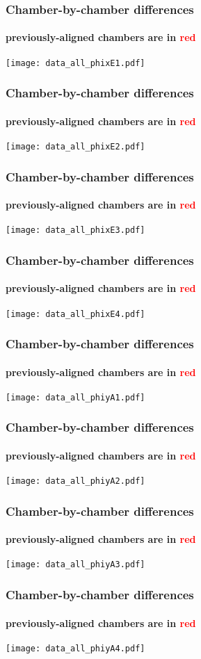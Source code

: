 \documentclass[compress]{beamer}
\begin{document}
\begin{frame}
\frametitle{Chamber-by-chamber differences}
\framesubtitle{previously-aligned chambers are in \textcolor{red}{red}}
\texttt{[image: data\_all\_phixE1.pdf]}
\end{frame}

\begin{frame}
\frametitle{Chamber-by-chamber differences}
\framesubtitle{previously-aligned chambers are in \textcolor{red}{red}}
\texttt{[image: data\_all\_phixE2.pdf]}
\end{frame}

\begin{frame}
\frametitle{Chamber-by-chamber differences}
\framesubtitle{previously-aligned chambers are in \textcolor{red}{red}}
\texttt{[image: data\_all\_phixE3.pdf]}
\end{frame}

\begin{frame}
\frametitle{Chamber-by-chamber differences}
\framesubtitle{previously-aligned chambers are in \textcolor{red}{red}}
\texttt{[image: data\_all\_phixE4.pdf]}
\end{frame}

\begin{frame}
\frametitle{Chamber-by-chamber differences}
\framesubtitle{previously-aligned chambers are in \textcolor{red}{red}}
\texttt{[image: data\_all\_phiyA1.pdf]}
\end{frame}

\begin{frame}
\frametitle{Chamber-by-chamber differences}
\framesubtitle{previously-aligned chambers are in \textcolor{red}{red}}
\texttt{[image: data\_all\_phiyA2.pdf]}
\end{frame}

\begin{frame}
\frametitle{Chamber-by-chamber differences}
\framesubtitle{previously-aligned chambers are in \textcolor{red}{red}}
\texttt{[image: data\_all\_phiyA3.pdf]}
\end{frame}

\begin{frame}
\frametitle{Chamber-by-chamber differences}
\framesubtitle{previously-aligned chambers are in \textcolor{red}{red}}
\texttt{[image: data\_all\_phiyA4.pdf]}
\end{frame}
\end{document}

